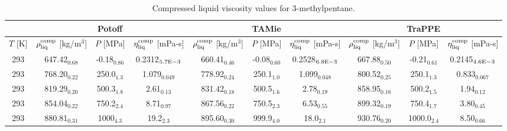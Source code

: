 \documentclass[preprint,review,11pt]{elsarticle}
\begin{document}
\begin{landscape}
	\begin{table}[H]
		\caption{Compressed liquid viscosity values for 3-methylpentane.}
		\begin{center}
			\begin{tabular}{|c|c|c|c|c|c|c|c|c|c|}
				\hline
				& \multicolumn{3}{c|}{Potoff}                                                                          & \multicolumn{3}{c|}{TAMie}                                                                              & \multicolumn{3}{c|}{TraPPE}                                                                          \\ \hline
				$T$ {[}K{]} & $\rho^{\rm comp}_{\rm liq}$ {[}kg/m$^3${]} & $P$ {[}MPa{]}  & $\eta^{\rm comp}_{\rm liq}$ {[}mPa-s{]} & $\rho^{\rm comp}_{\rm liq}$ {[}kg/m$^3${]} & $P$ {[}MPa{]}     & $\eta^{\rm comp}_{\rm liq}$ {[}mPa-s{]} & $\rho^{\rm comp}_{\rm liq}$ {[}kg/m$^3${]} & $P$ {[}MPa{]}  & $\eta^{\rm comp}_{\rm liq}$ {[}mPa-s{]} \\ \hline
				293         & 647.42$_{0.68}$                            & -0.18$_{0.86}$ & 0.2312$_{5.7 \rm E-3}$                      & 660.41$_{0.46}$                         & -0.08$_{0.60}$ & 0.2528$_{6.8 \rm E-3}$                      & 667.88$_{0.50}$                         & -0.21$_{0.61}$ & 0.2145$_{4.6 \rm E-3}$                      \\ \hline
				293         & 768.20$_{0.22}$                            & 250.0$_{1.3}$  & 1.079$_{0.049}$                        & 778.92$_{0.24}$                         & 250.1$_{1.0}$  & 1.099$_{0.048}$                        & 800.52$_{0.25}$                         & 250.1$_{1.3}$  & 0.833$_{0.067}$                        \\ \hline
				293         & 819.29$_{0.20}$                            & 500.3$_{1.8}$  & 2.61$_{0.13}$                          & 831.42$_{0.18}$                         & 500.5$_{1.6}$  & 2.78$_{0.19}$                          & 858.95$_{0.18}$                         & 500.2$_{1.5}$  & 1.94$_{0.12}$                          \\ \hline
				293         & 854.04$_{0.22}$                            & 750.2$_{2.4}$  & 8.71$_{0.97}$                          & 867.56$_{0.22}$                         & 750.5$_{2.3}$  & 6.53$_{0.55}$                          & 899.32$_{0.19}$                         & 750.4$_{1.7}$  & 3.80$_{0.45}$                          \\ \hline
				293         & 880.81$_{0.31}$                            & 1000$_{4.3}$   & 19.2$_{2.3}$                           & 895.60$_{0.30}$                         & 999.9$_{4.0}$  & 18.0$_{2.1}$                           & 930.76$_{0.20}$                         & 1000.0$_{2.4}$ & 8.50$_{0.66}$                          \\ \hline
			\end{tabular}
		\end{center}
	\end{table}



\end{landscape}
\end{document}
